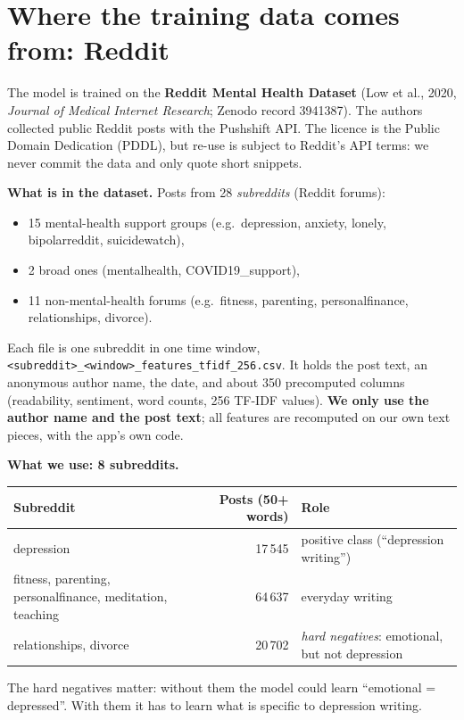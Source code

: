 \documentclass[11pt,a4paper]{article}
\begin{document}
\section{Where the training data comes from: Reddit}

The model is trained on the \textbf{Reddit Mental Health Dataset} (Low et al., 2020, \emph{Journal of
Medical Internet Research}; Zenodo record 3941387). The authors collected public Reddit posts with the
Pushshift API. The licence is the Public Domain Dedication (PDDL), but re-use is subject to Reddit's API
terms: we never commit the data and only quote short snippets.

\textbf{What is in the dataset.} Posts from 28 \emph{subreddits} (Reddit forums):
\begin{itemize}
\item 15 mental-health support groups (e.g.\ depression, anxiety, lonely, bipolarreddit, suicidewatch),
\item 2 broad ones (mentalhealth, COVID19\_support),
\item 11 non-mental-health forums (e.g.\ fitness, parenting, personalfinance, relationships, divorce).
\end{itemize}
Each file is one subreddit in one time window, \texttt{<subreddit>\_<window>\_features\_tfidf\_256.csv}.
It holds the post text, an anonymous author name, the date, and about 350 precomputed columns
(readability, sentiment, word counts, 256 TF-IDF values). \textbf{We only use the author name and the post
text}; all features are recomputed on our own text pieces, with the app's own code.

\textbf{What we use: 8 subreddits.}
\begin{center}
\small
\begin{tabular}{@{}L{5.2cm}rL{6.4cm}@{}}
\toprule
\textbf{Subreddit} & \textbf{Posts (50+ words)} & \textbf{Role}\\
\midrule
depression & 17\,545 & positive class (``depression writing'')\\
fitness, parenting, personalfinance, meditation, teaching & 64\,637 & everyday writing\\
relationships, divorce & 20\,702 & \emph{hard negatives}: emotional, but not depression\\
\bottomrule
\end{tabular}
\end{center}
The hard negatives matter: without them the model could learn ``emotional = depressed''. With them it
has to learn what is specific to depression writing.
\end{document}
